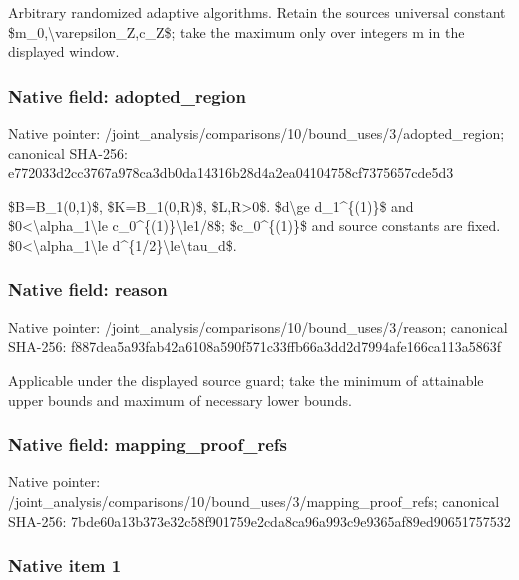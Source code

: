 \documentclass[10pt,a4paper]{article}
\begin{document}
Arbitrary randomized adaptive algorithms. Retain the sources universal constant \$m\_0,\textbackslash{}varepsilon\_Z,c\_Z\$; take the maximum only over integers m in the displayed window.


\subsubsection{Native field: adopted\_region}


Native pointer: /joint\_analysis/comparis\allowbreak{}ons/10/bound\_uses/3/adop\allowbreak{}ted\_region; canonical SHA-256: e772033d2cc3767a978ca3db\allowbreak{}0da14316b28d4a2ea0410475\allowbreak{}8cf7375657cde5d3


\$B=B\_1(0,1)\$, \$K=B\_1(0,R)\$, \$L,R>0\$. \$d\textbackslash{}ge d\_1\textasciicircum{}\{(1)\}\$ and \$0<\textbackslash{}alpha\_1\textbackslash{}le c\_0\textasciicircum{}\{(1)\}\textbackslash{}le1/8\$; \$c\_0\textasciicircum{}\{(1)\}\$ and source constants are fixed. \$0<\textbackslash{}alpha\_1\textbackslash{}le d\textasciicircum{}\{1/2\}\textbackslash{}le\textbackslash{}tau\_d\$.


\subsubsection{Native field: reason}


Native pointer: /joint\_analysis/comparis\allowbreak{}ons/10/bound\_uses/3/reas\allowbreak{}on; canonical SHA-256: f887dea5a93fab42a6108a59\allowbreak{}0f571c33ffb66a3dd2d7994a\allowbreak{}fe166ca113a5863f


Applicable under the displayed source guard; take the minimum of attainable upper bounds and maximum of necessary lower bounds.


\subsubsection{Native field: mapping\_proof\_refs}


Native pointer: /joint\_analysis/comparis\allowbreak{}ons/10/bound\_uses/3/mapp\allowbreak{}ing\_proof\_refs; canonical SHA-256: 7bde60a13b373e32c58f9017\allowbreak{}59e2cda8ca96a993c9e9365a\allowbreak{}f89ed90651757532



\subsubsection{Native item 1}
\end{document}
